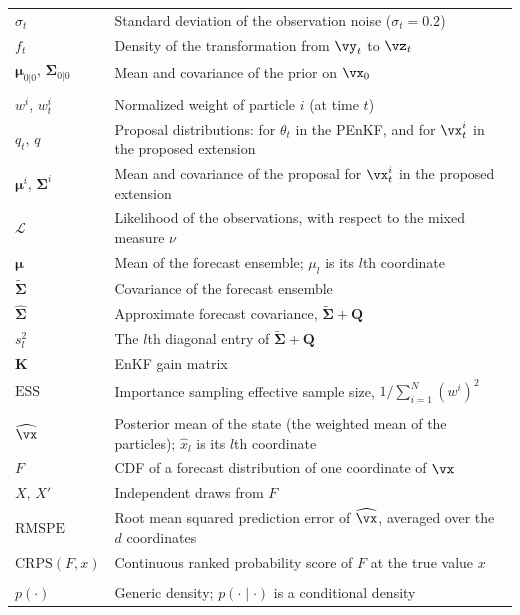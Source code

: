 \documentclass[12pt]{article}
\begin{document}
\begin{longtable}{@{}lp{}@{}}
$\sigma_t$ & Standard deviation of the observation noise ($\sigma_t = 0.2$) \\
$f_t$ & Density of the transformation from $\vy_t$ to $\vz_t$ \\
$\boldsymbol\mu_{0|0}$, $\mathbf\Sigma_{0|0}$ & Mean and covariance of the prior on $\vx_0$ \\
\addlinespace
\multicolumn{2}{@{}l}{\emph{Algorithms}} \\
$w^i$, $w^i_t$ & Normalized weight of particle $i$ (at time $t$) \\
$q_t$, $q$ & Proposal distributions: for $\theta_t$ in the PEnKF, and for $\vx^i_t$ in the proposed extension \\
$\boldsymbol\mu^i$, $\mathbf\Sigma^i$ & Mean and covariance of the proposal for $\vx^i_t$ in the proposed extension \\
$\mathcal L$ & Likelihood of the observations, with respect to the mixed measure $\nu$ \\
$\boldsymbol\mu$ & Mean of the forecast ensemble; $\mu_l$ is its $l$th coordinate \\
$\tilde{\mathbf\Sigma}$ & Covariance of the forecast ensemble \\
$\widehat{\mathbf\Sigma}$ & Approximate forecast covariance, $\tilde{\mathbf\Sigma} + \mathbf Q$ \\
$s_l^2$ & The $l$th diagonal entry of $\tilde{\mathbf\Sigma} + \mathbf Q$ \\
$\mathbf K$ & EnKF gain matrix \\
$\text{ESS}$ & Importance sampling effective sample size, $1 / \sum_{i=1}^N (w^i)^2$ \\
\addlinespace
\multicolumn{2}{@{}l}{\emph{Evaluation}} \\
$\widehat\vx$ & Posterior mean of the state (the weighted mean of the particles); $\widehat x_l$ is its $l$th coordinate \\
$F$ & CDF of a forecast distribution of one coordinate of $\vx$ \\
$X$, $X'$ & Independent draws from $F$ \\
$\text{RMSPE}$ & Root mean squared prediction error of $\widehat\vx$, averaged over the $d$ coordinates \\
$\text{CRPS}(F, x)$ & Continuous ranked probability score of $F$ at the true value $x$ \\
\addlinespace
\multicolumn{2}{@{}l}{\emph{Distributions and functions}} \\
$p(\cdot)$ & Generic density; $p(\cdot \mid \cdot)$ is a conditional density \\

\end{longtable}
\end{document}
